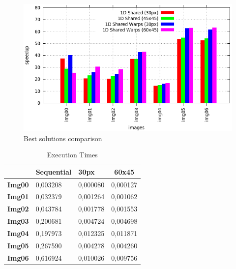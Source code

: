 \documentclass[a4paper]{article}
\begin{document}
\begin{figure}[!ht]
    \centering
    \includegraphics[width=0.7\linewidth]{res/new/histogram_more_confronto}
    \caption{Best solutions comparison}
    \label{fig:dbsc}
\end{figure}
\FloatBarrier

\begin{table}[!ht]
\centering
\begin{tabular}{|l|l|l|l|}
\hline
\multicolumn{1}{|c|}{\textbf{}}      & \textbf{Sequential} & \textbf{30px}                 & \multicolumn{1}{c|}{\textbf{60x45}} \\ \hline
\multicolumn{1}{|c|}{\textbf{Img00}} & 0,003208            & \multicolumn{1}{c|}{0,000080} & \multicolumn{1}{c|}{0,000127}       \\ \hline
\textbf{Img01}                       & 0,032379            & 0,001264                      & 0,001062                            \\ \hline
\textbf{Img02}                       & 0,043784            & 0,001778                      & 0,001553                            \\ \hline
\textbf{Img03}                       & 0,200681            & 0,004724                      & 0,004698                            \\ \hline
\textbf{Img04}                       & 0,197973            & 0,012325                      & 0,011871                            \\ \hline
\textbf{Img05}                       & 0,267590            & 0,004278                      & 0,004260                            \\ \hline
\textbf{Img06}                       & 0,616924            & 0,010026                      & 0,009756                            \\ \hline
\end{tabular}
\caption{Execution Times}
\label{tab:histo_exe}
\end{table}
\FloatBarrier
\end{document}
